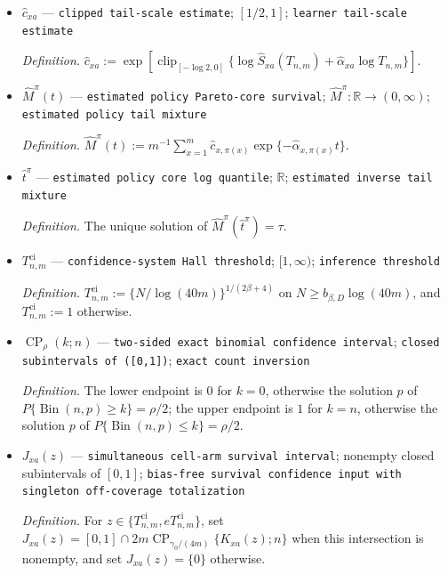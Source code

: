 \documentclass{article}
\begin{document}
\begin{itemize}
  \par\smallskip\noindent\emph{Definition.} \(\widehat\alpha_{xa}:=\operatorname{clip}_{[1,4]}\{\log\widehat S_{xa}(T_{n,m})-\log\widehat S_{xa}(eT_{n,m})\}\).
  \item \(\widehat c_{xa}\) --- \texttt{clipped tail-\allowbreak{}scale estimate}; \([1/2,1]\); \texttt{learner tail-\allowbreak{}scale estimate}
  \par\smallskip\noindent\emph{Definition.} \(\widehat c_{xa}:=\exp[\operatorname{clip}_{[-\log2,0]}\{\log\widehat S_{xa}(T_{n,m})+\widehat\alpha_{xa}\log T_{n,m}\}]\).
  \item \(\widehat M^{\pi}(t)\) --- \texttt{estimated policy Pareto-\allowbreak{}core survival}; \(\widehat M^{\pi}:\mathbb R\to(0,\infty)\); \texttt{estimated policy tail mixture}
  \par\smallskip\noindent\emph{Definition.} \(\widehat M^{\pi}(t):=m^{-1}\sum_{x=1}^m\widehat c_{x,\pi(x)}\exp\{-\widehat\alpha_{x,\pi(x)}t\}\).
  \item \(\widehat t^{\pi}\) --- \texttt{estimated policy core log quantile}; \(\mathbb R\); \texttt{estimated inverse tail mixture}
  \par\smallskip\noindent\emph{Definition.} The unique solution of \(\widehat M^{\pi}(\widehat t^{\pi})=\tau\).
  \item \(T^{\mathrm{ci}}_{n,m}\) --- \texttt{confidence-\allowbreak{}system Hall threshold}; \([1,\infty)\); \texttt{inference threshold}
  \par\smallskip\noindent\emph{Definition.} \(T^{\mathrm{ci}}_{n,m}:=\{N/\log(40m)\}^{1/(2\beta+4)}\) on \(N\ge b_{\beta,D}\log(40m)\), and \(T^{\mathrm{ci}}_{n,m}:=1\) otherwise.
  \item \(\operatorname{CP}_{\rho}(k;n)\) --- \texttt{two-\allowbreak{}sided exact binomial confidence interval}; \texttt{closed subintervals of ([0,\allowbreak{}1])}; \texttt{exact count inversion}
  \par\smallskip\noindent\emph{Definition.} The lower endpoint is \(0\) for \(k=0\), otherwise the solution \(p\) of \(P\{\operatorname{Bin}(n,p)\ge k\}=\rho/2\); the upper endpoint is \(1\) for \(k=n\), otherwise the solution \(p\) of \(P\{\operatorname{Bin}(n,p)\le k\}=\rho/2\).
  \item \(J_{xa}(z)\) --- \texttt{simultaneous cell-\allowbreak{}arm survival interval}; nonempty closed subintervals of \([0,1]\); \texttt{bias-\allowbreak{}free survival confidence input with singleton off-\allowbreak{}coverage totalization}
  \par\smallskip\noindent\emph{Definition.} For \(z\in\{T^{\mathrm{ci}}_{n,m},eT^{\mathrm{ci}}_{n,m}\}\), set \(J_{xa}(z)=[0,1]\cap 2m\operatorname{CP}_{\gamma_0/(4m)}\{K_{xa}(z);n\}\) when this intersection is nonempty, and set \(J_{xa}(z)=\{0\}\) otherwise.

\end{itemize}
\end{document}
